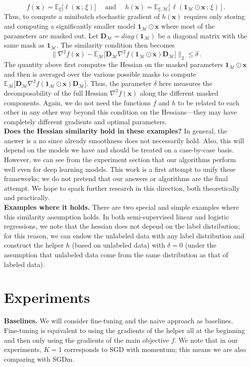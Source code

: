 \documentclass[10pt]{article} %
\theoremstyle{plain}
\theoremstyle{definition}
\theoremstyle{remark}
\newcommand{\norm}[1]{\|#1\|_2}
\def\1{\bm{1}}
\def\vx{{\bm{x}}}
\def\mD{{\bm{D}}}
\newcommand{\E}{\mathbb{E}}
\begin{document}
\[
    f(\vx) = \E_{\xi}\big[\ell(\vx\,;\, \xi)\big] \quad \text{ and } \quad h(\vx) = \E_{\xi, \mathcal{M}}\big[\,\ell( \1_{\mathcal{M}} \odot \vx \,;\, \xi)\,\big]\,.
\]
Thus, to compute a minibatch stochastic gradient of $h(\vx)$ requires only storing and computing a significantly smaller model $\1_{\mathcal{M}} \odot \vx$ where most of the parameters are masked out. Let $\mD_{\mathcal{M}} = diag(\1_{\mathcal{M}})$ be a diagonal matrix with the same mask as $\1_{\mathcal{M}}$. The similarity condition then becomes
\[
    \norm{\nabla^2 f(\vx)  - \E_{\mathcal{M}}\big[ \mD_{\mathcal{M}}\nabla^2 f( \1_{\mathcal{M}} \odot \vx )\mD_{\mathcal{M}}\big] } \leq \delta\,.
\]
The quantity above first computes the Hessian on the masked parameters $\1_{\mathcal{M}} \odot \vx $ and then is averaged over the various possible masks to compute $\E_{\mathcal{M}}\big[ \mD_{\mathcal{M}}\nabla^2 f( \1_{\mathcal{M}} \odot \vx )\mD_{\mathcal{M}}\big]$. Thus, the parameter $\delta$ here measures the decomposability of the full Hessian $\nabla^2 f(\vx)$ along the different masked components. Again, we do not need the functions $f$ and $h$ to be related to each other in any other way beyond this condition on the Hessians---they may have completely different gradients and optimal parameters.\\
\textbf{Does the Hessian similarity hold in these examples?} In general, the answer is a no since already smoothness does not necessarily hold. Also, this will depend on the models we have and should be treated on a case-by-case basis. However, we can see from the experiment section that our algorithms perform well even for deep learning models. This work is a first attempt to unify these frameworks; we do not pretend that our answers or algorithms are the final attempt. We hope to spark further research in this direction, both theoretically and practically. \\
\textbf{Examples where it holds.} There are two special and simple examples where this similarity assumption holds. In both semi-supervised linear and logistic regressions, we note that the hessian does not depend on the label distribution; for this reason, we can endow the unlabeled data with any label distribution and construct the helper $h$ (based on unlabeled data) with $\delta=0$ (under the assumption that unlabeled data come from the same distribution as that of labeled data).

\section{Experiments}
\textbf{Baselines.} We will consider fine-tuning and the naive approach as baselines. Fine-tuning is equivalent to using the gradients of the helper all at the beginning and then only using the gradients of the main objective $f$. We note that in our experiments, $K=1$ corresponds to SGD with momentum; this means we are also comparing with SGDm. 
\end{document}
